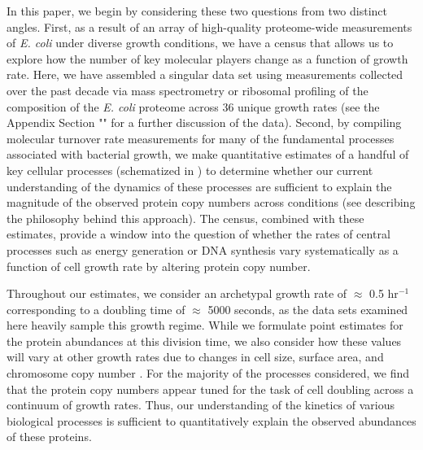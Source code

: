 
In this paper, we begin by considering these two questions from two distinct
angles. First, as a result of an array of high-quality proteome-wide
measurements of \textit{E. coli} under diverse growth conditions, we have a
census that allows us to explore how the number of key molecular players change
as a function of growth rate. Here, we have assembled a singular data set using
measurements collected over the past decade via mass spectrometry
\citep{schmidt2016, peebo2015, valgepea2013} or ribosomal profiling
\citep{li2014} of the composition of the \textit{E. coli} proteome across 36
unique growth rates (see the Appendix Section "" for
a further discussion of the data). Second, by compiling molecular turnover rate
measurements for many of the fundamental processes associated with bacterial
growth, we make quantitative estimates of a handful of key cellular processes
(schematized in ) to determine whether our current understanding
of the dynamics of these processes are sufficient to explain the magnitude of
the observed protein copy numbers across conditions (see 
describing the philosophy behind this approach). The census, combined with these
estimates, provide a window into the question of whether the rates of central
processes such as energy generation or DNA synthesis vary systematically as a
function of cell growth rate by altering protein copy number.

Throughout our estimates, we consider an archetypal growth rate of $\approx$
0.5 hr$^{-1}$ corresponding to a doubling time of $\approx$ 5000 seconds, as
the data sets examined here heavily sample this growth regime. While we
formulate point estimates for the protein abundances at this division time,
we also consider how these values will vary at other growth rates due to
changes in cell size, surface area, and chromosome copy number
\citep{taheriaraghi2015, harris2018}. For the majority of the processes
considered, we find that the protein copy numbers appear tuned for the task
of cell doubling across a continuum of growth rates. Thus, our understanding
of the kinetics of various biological processes is sufficient to
quantitatively explain the observed abundances of these proteins.

